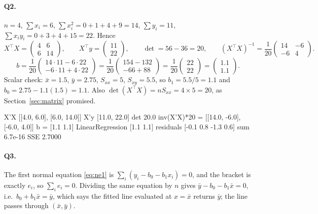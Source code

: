 \documentclass[11pt]{article}
\begin{document}
\paragraph{Q2.} $n = 4$, $\sum x_i = 6$, $\sum x_i^2 = 0+1+4+9 = 14$,
$\sum y_i = 11$, $\sum x_iy_i = 0+3+4+15 = 22$. Hence
\[
  X^{\!\top}\!X = \begin{pmatrix}4 & 6\\ 6 & 14\end{pmatrix},\qquad
  X^{\!\top}y = \begin{pmatrix}11\\ 22\end{pmatrix},\qquad
  \det = 56 - 36 = 20,\qquad
  (X^{\!\top}\!X)^{-1} = \frac{1}{20}\begin{pmatrix}14 & -6\\ -6 & 4
    \end{pmatrix}.
\]
\[
  b = \frac{1}{20}\begin{pmatrix}14\cdot 11 - 6\cdot 22\\
    -6\cdot 11 + 4\cdot 22\end{pmatrix}
    = \frac{1}{20}\begin{pmatrix}154 - 132\\ -66 + 88\end{pmatrix}
    = \frac{1}{20}\begin{pmatrix}22\\ 22\end{pmatrix}
    = \begin{pmatrix}1.1\\ 1.1\end{pmatrix}.
\]
Scalar check: $\bar x = 1.5$, $\bar y = 2.75$, $S_{xx} = 5$, $S_{xy} = 5.5$,
so $b_1 = 5.5/5 = 1.1$ and $b_0 = 2.75 - 1.1(1.5) = 1.1$. Also
$\det(X^{\!\top}\!X) = nS_{xx} = 4\times 5 = 20$, as
Section~\ref{sec:matrix} promised.
\begin{codeout}
   X'X [[4.0, 6.0], [6.0, 14.0]]  X'y [11.0, 22.0]  det 20.0
   inv(X'X)*20 = [[14.0, -6.0], [-6.0, 4.0]]
   b = [1.1 1.1]   LinearRegression [1.1 1.1]
   residuals [-0.1  0.8 -1.3  0.6]  sum 6.7e-16  SSE 2.7000
\end{codeout}

\paragraph{Q3.} The first normal equation \eqref{eq:ne1} is
$\sum_i(y_i - b_0 - b_1x_i) = 0$, and the bracket is exactly $e_i$, so
$\sum_i e_i = 0$. Dividing the same equation by $n$ gives
$\bar y - b_0 - b_1\bar x = 0$, i.e.\ $b_0 + b_1\bar x = \bar y$, which says
the fitted line evaluated at $x = \bar x$ returns $\bar y$; the line passes
through $(\bar x,\bar y)$.
\end{document}
